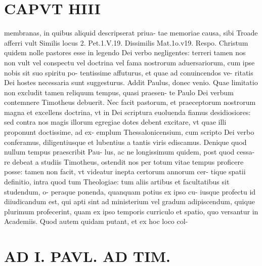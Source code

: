 \documentclass{article}
\begin{document}
\begin{pages}
\section*{CAPVT  HIII }
\marginpar{[ p.233 ]}\pstart membranas, in quibus aliquid descripserat priua- tae memoriae causa, sibi Troade afferri vult Similis locus 2. Pet.1.V.19. Dissimilis Mat.1o.v19. Respo. Christum quidem nolle pastores esse in legendo Dei verbo negligentes: terreri tamen nos non vult vel conspectu vel doctrina vel fama nostrorum aduersariorum, cum ipse nobis sit suo spiritu po- tentissime affuturus, et quae ad conuincendos ve- ritatis Dei hostes necessaria sunt suggesturus. Addit Paulus, donec venio. Quae limitatio non excludit tamen reliquum tempus, quasi praesen- te Paulo Dei verbum contemnere Timotheus debuerit. Nec facit pastorum, et praeceptorum nostrorum magna et excellens doctrina, vt in Dei scriptura euoluenda fiamus desidiosiores: sed contra nos magis illorum egregiae dotes debent excitare, vt quae illi proponunt doctissime, ad ex- emplum Thessalonicensium, cum scripto Dei verbo conferamus, diligentiusque et lubentius a tantis viris ediscamus. Denique quod nullum tempus praescribit Pau- lus, ac ne longissimum quidem, post quod cessa- re debeat a studiis Timotheus, ostendit nos per totum vitae tempus proficere posse: tamen non facit, vt videatur inepta certorum annorum cer- tique spatii definitio, intra quod tum Theologiae: tum aliis artibus et facultatibus sit studendum, o- peraque ponenda, quanquam potius ex ipso cu- iusque profectu id diiudicandum est, qui apti sint ad ministerium vel gradum adipiscendum, quique plurimum profecerint, quam ex ipso temporis curriculo et spatio, quo versantur in Academiis. Quod autem quidam putant, et ex hoc loco col-  \pend
\section*{AD I. PAVL. AD TIM. }
\marginpar{[ p.234 ]}\pstart {}
{}

\end{pages}
\end{document}
